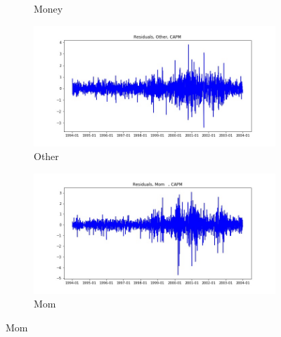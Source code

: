 \documentclass{article}
\begin{document}
\begin{figure}
\begin{subfigure}[b]{0.5\textwidth}
    \caption{Money}
    \label{fig:2}
  \end{subfigure}
  \begin{subfigure}[b]{0.5\textwidth}
    \centering
    \includegraphics[width=\textwidth]{Other/resid_ts_CAPM.jpg}
    \caption{Other}
    \label{fig:2}
  \end{subfigure}
  \begin{subfigure}[b]{0.5\textwidth}
    \centering
    \includegraphics[width=\textwidth]{Mom/resid_ts_CAPM.jpg}
    \caption{Mom}
    \label{fig:2}
  \end{subfigure}

\end{figure}
\end{document}
